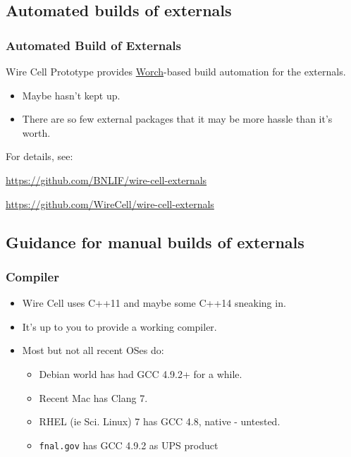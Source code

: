 \documentclass[xcolor=dvipsnames]{beamer}
\begin{document}
\subsection{Automated builds of externals}
\begin{frame}
  \frametitle{Automated Build of Externals}

  Wire Cell Prototype provides
  \href{https://github.com/brettviren/worch}{Worch}-based build
  automation for the externals.  

  \begin{itemize}
  \item Maybe hasn't kept up.
  \item There are so few external packages that it may be more hassle than it's worth.
  \end{itemize}

  For details, see:

  \begin{center}
      \url{https://github.com/BNLIF/wire-cell-externals}

      \url{https://github.com/WireCell/wire-cell-externals}
  \end{center}
\end{frame}

\subsection{Guidance for manual builds of externals}

\begin{frame}
  \frametitle{Compiler}
  \begin{itemize}
  \item Wire Cell uses C++11 and maybe some C++14 sneaking in. 
  \item It's up to you to provide a working compiler.
  \item Most but not all recent OSes do:
    \begin{itemize}
    \item Debian world has had GCC 4.9.2+ for a while.
    \item Recent Mac has Clang 7.
    \item RHEL (ie Sci. Linux) 7 has GCC 4.8, native - untested.
    \item \texttt{fnal.gov} has GCC 4.9.2 as UPS product
    \end{itemize}
  \end{itemize}
\end{frame}
\end{document}
